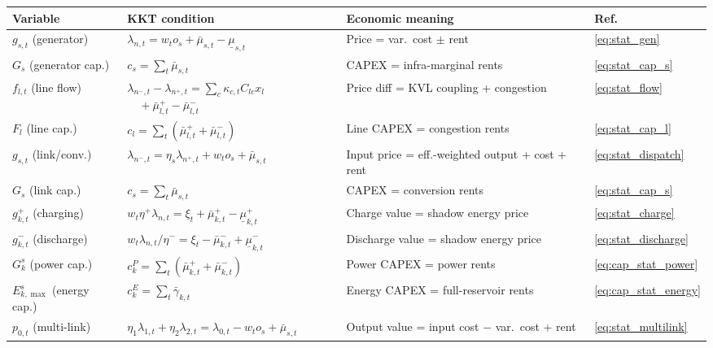\documentclass{article}
\begin{document}
\begin{table}[h!]
\centering
\renewcommand{\arraystretch}{1.4}
\small
\begin{tabular}{p{2.8cm}p{6.0cm}p{3.8cm}l}
\hline
\textbf{Variable} & \textbf{KKT condition} & \textbf{Economic meaning}
    & \textbf{Ref.} \\
\hline
$g_{s,t}$ (generator) &
    $\lambda_{n,t} = w_t o_s + \bar{\mu}_{s,t} - \underline{\mu}_{s,t}$ &
    Price = var.\ cost $\pm$ rent &
    \eqref{eq:stat_gen} \\
$G_s$ (generator cap.) &
    $c_s = \sum_t \bar{\mu}_{s,t}$ &
    CAPEX = infra-marginal rents &
    \eqref{eq:stat_cap_s} \\
$f_{l,t}$ (line flow) &
    $\lambda_{n^-,t} - \lambda_{n^+,t} = \sum_c \kappa_{c,t} C_{lc} x_l$\newline$\quad+ \bar{\mu}^+_{l,t} - \bar{\mu}^-_{l,t}$ &
    Price diff = KVL coupling + congestion &
    \eqref{eq:stat_flow} \\
$F_l$ (line cap.) &
    $c_l = \sum_t (\bar{\mu}^+_{l,t} + \bar{\mu}^-_{l,t})$ &
    Line CAPEX = congestion rents &
    \eqref{eq:stat_cap_l} \\
$g_{s,t}$ (link/conv.) &
    $\lambda_{n^-,t} = \eta_s \lambda_{n^+,t} + w_t o_s + \bar{\mu}_{s,t}$ &
    Input price = eff.-weighted output + cost + rent &
    \eqref{eq:stat_dispatch} \\
$G_s$ (link cap.) &
    $c_s = \sum_t \bar{\mu}_{s,t}$ &
    CAPEX = conversion rents &
    \eqref{eq:stat_cap_s} \\
$g^+_{k,t}$ (charging) &
    $w_t \eta^+ \lambda_{n,t} = \xi_t + \bar{\mu}^+_{k,t} - \underline{\mu}^+_{k,t}$ &
    Charge value = shadow energy price &
    \eqref{eq:stat_charge} \\
$g^-_{k,t}$ (discharge) &
    $w_t \lambda_{n,t} / \eta^- = \xi_t - \bar{\mu}^-_{k,t} + \underline{\mu}^-_{k,t}$ &
    Discharge value = shadow energy price &
    \eqref{eq:stat_discharge} \\
$G^s_k$ (power cap.) &
    $c^P_k = \sum_t (\bar{\mu}^+_{k,t} + \bar{\mu}^-_{k,t})$ &
    Power CAPEX = power rents &
    \eqref{eq:cap_stat_power} \\
$E^s_{k,\max}$ (energy cap.) &
    $c^E_k = \sum_t \bar{\gamma}_{k,t}$ &
    Energy CAPEX = full-reservoir rents &
    \eqref{eq:cap_stat_energy} \\
$p_{0,t}$ (multi-link) &
    $\eta_1 \lambda_{1,t} + \eta_2 \lambda_{2,t} = \lambda_{0,t} - w_t o_s + \bar{\mu}_{s,t}$ &
    Output value = input cost $-$ var.\ cost + rent &
    \eqref{eq:stat_multilink} \\

\end{tabular}
\end{table}
\end{document}
